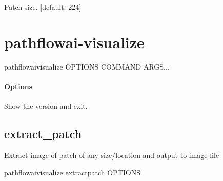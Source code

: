 \documentclass[letterpaper,10pt,english]{sphinxmanual}
\begin{document}
\begin{fulllineitems}
\label{\detokenize{index:cmdoption-pathflowai-preprocess-remove-basename-from-db-ps}}
Patch size.  {[}default: 224{]}

\end{fulllineitems}



\chapter{pathflowai-visualize}
\label{\detokenize{index:pathflowai-visualize}}
\begin{sphinxVerbatim}[commandchars=\\\{\}]
pathflowai\PYGZhy{}visualize \PYG{o}{[}OPTIONS\PYG{o}{]} COMMAND \PYG{o}{[}ARGS\PYG{o}{]}...
\end{sphinxVerbatim}
\subsubsection*{Options}

\begin{fulllineitems}
\label{\detokenize{index:cmdoption-pathflowai-visualize-version}}
Show the version and exit.

\end{fulllineitems}



\section{extract\_patch}
\label{\detokenize{index:pathflowai-visualize-extract-patch}}
Extract image of patch of any size/location and output to image file

\begin{sphinxVerbatim}[commandchars=\\\{\}]
pathflowai\PYGZhy{}visualize extract\PYGZus{}patch \PYG{o}{[}OPTIONS\PYG{o}{]}
\end{sphinxVerbatim}
\end{document}
